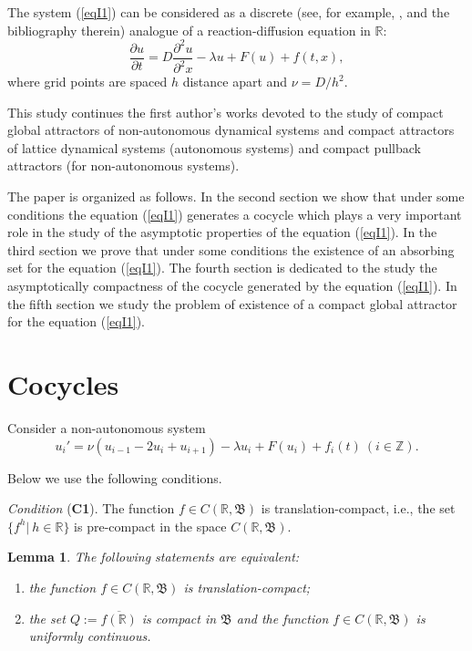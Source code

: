 \documentclass{amsart}%
\newtheorem{lemma}{Lemma}[section]
\begin{document}
The system (\ref{eqI1}) can be considered as a discrete (see, for
example, \cite{BLW_2001}, \cite{HK_2023} and the bibliography
therein) analogue of a reaction-diffusion equation in $\mathbb R$:
\begin{equation}\label{eqI1.1}
 \frac{\partial{u}}{\partial{t}} = D\frac{\partial^{2}{u}}{\partial^{2}{x}}-\lambda u + F(u) + f(t,x),
\end{equation}
where grid points are spaced $h$ distance apart and $\nu =
D/h^{2}$.

This study continues the first author's works devoted to the study
of compact global attractors of non-autonomous dynamical systems
\cite{Che_2015} and compact attractors of lattice dynamical
systems \cite{BLW_2001} (autonomous systems) and compact pullback
attractors \cite{HK_2023} (for non-autonomous systems).

The paper is organized as follows. In the second section we show
that under some conditions the equation (\ref{eqI1}) generates a
cocycle which plays a very important role in the study of the
asymptotic properties of the equation (\ref{eqI1}). In the third
section we prove that under some conditions the existence of an
absorbing set for the equation (\ref{eqI1}). The fourth section is
dedicated to the study the asymptotically compactness of the
cocycle generated by the equation (\ref{eqI1}). In the fifth
section we study the problem of existence of a compact global
attractor for the equation (\ref{eqI1}).


\section{Cocycles}\label{Sec2}

Consider a non-autonomous system
\begin{equation}\label{eq2.1}
u_{i}'=\nu (u_{i-1}-2u_i+u_{i+1})-\lambda u_{i}+F(u_i)+f_{i}(t)\
(i\in \mathbb Z) .
\end{equation}

Below we use the following conditions.

\emph{Condition }(\textbf{C1}). \label{C1}
The function $f\in C(\mathbb
R,\mathfrak B)$ is translation-compact, i.e., the set $\{f^{h}|\
h\in \mathbb R\}$ is pre-compact in the space $C(\mathbb
R,\mathfrak B)$.

\begin{lemma}\label{l2.1} \cite{Sel_1971,sib} The following statements are equivalent:
\begin{enumerate}
\item the function $f\in C(\mathbb R,\mathfrak B)$ is
translation-compact; \item the set $Q:=\overline{f(\mathbb R)}$ is
compact in $\mathfrak B$ and the function $f\in C(\mathbb
R,\mathfrak B)$ is uniformly continuous.
\end{enumerate}
\end{lemma}
\end{document}

